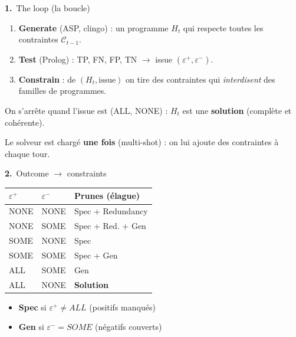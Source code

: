 \documentclass[10pt]{article}
\newcommand{\num}[1]{\textcolor{marine}{\textbf{#1.}}~}
\begin{document}
\vspace{5pt}

\begin{minipage}[t]{0.32\textwidth}
\begin{bloc}{\num{1}The loop (la boucle)}
\begin{enumerate}[leftmargin=12pt, itemsep=1pt, topsep=1pt]
  \item \textbf{Generate} (ASP, clingo) : un programme $H_t$ qui respecte toutes les contraintes $\mathcal{C}_{t-1}$.
  \item \textbf{Test} (Prolog) : TP, FN, FP, TN $\to$ issue $(\varepsilon^+,\varepsilon^-)$.
  \item \textbf{Constrain} : de $(H_t,\text{issue})$ on tire des contraintes qui \emph{interdisent} des familles de programmes.
\end{enumerate}
On s'arrête quand l'issue est (ALL, NONE) : $H_t$ est une \textbf{solution} (complète et cohérente).
\begin{astuce}
Le solveur est chargé \textbf{une fois} (multi-shot) : on lui ajoute des contraintes à chaque tour.
\end{astuce}
\end{bloc}
\end{minipage}\hfill
\begin{minipage}[t]{0.32\textwidth}
\begin{bloc}{\num{2}Outcome $\to$ constraints}
{\scriptsize
\renewcommand{\arraystretch}{1.15}
\begin{tabular}{@{}l l L{2.6cm}@{}}
$\varepsilon^+$ & $\varepsilon^-$ & Prunes (élague)\\\hline
NONE & NONE & Spec + Redundancy\\
NONE & SOME & Spec + Red. + Gen\\
SOME & NONE & Spec\\
SOME & SOME & Spec + Gen\\
ALL & SOME & Gen\\
ALL & NONE & \textbf{Solution}\\
\end{tabular}}
\vspace{2pt}
\begin{itemize}
  \item \textbf{Spec} si $\varepsilon^+\neq\mathit{ALL}$ (positifs manqués)
  \item \textbf{Gen} si $\varepsilon^-=\mathit{SOME}$ (négatifs couverts)
\end{itemize}
\end{bloc}
\end{minipage}\hfill
\end{document}
